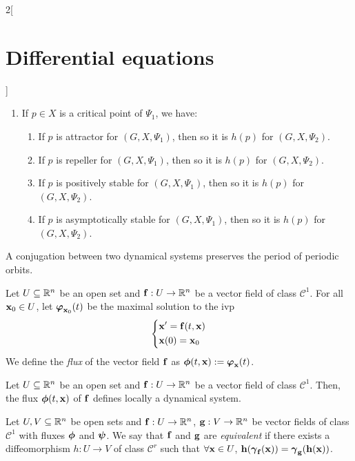 \documentclass[../../../main.tex]{subfiles}
\begin{document}
\begin{multicols}{2}[\section{Differential equations}]
\begin{prop}
\begin{enumerate}
\begin{enumerate}
            \end{enumerate}
      \item If $p\in X$ is a critical point of $\Psi_1$, we have:
            \begin{enumerate}
              \item If $p$ is attractor for $(G,X,\Psi_1)$, then so it is $h(p)$ for $(G,X,\Psi_2)$.
              \item If $p$ is repeller for $(G,X,\Psi_1)$, then so it is $h(p)$ for $(G,X,\Psi_2)$.
              \item If $p$ is positively stable for $(G,X,\Psi_1)$, then so it is $h(p)$ for $(G,X,\Psi_2)$.
              \item If $p$ is asymptotically stable for $(G,X,\Psi_1)$, then so it is $h(p)$ for $(G,X,\Psi_2)$.
            \end{enumerate}
    \end{enumerate}
  \end{prop}
  \begin{prop}
    A conjugation between two dynamical systems preserves the period of periodic orbits.
  \end{prop}
  \begin{definition}
    Let $U\subseteq \mathbb{R}^n$ be an open set and $\boldsymbol{\mathrm{f}}:U\rightarrow\mathbb{R}^n$ be a vector field of class $\mathcal{C}^1$. For all $\boldsymbol{\mathrm{x}}_0\in U$, let $\boldsymbol{\mathrm{\varphi}}_{\boldsymbol{\mathrm{x}}_0}(t)$ be the maximal solution to the ivp
    $$\left\{
      \begin{aligned}
         & \boldsymbol{\mathrm{x}}'      =\boldsymbol{\mathrm{f}}(t,\boldsymbol{\mathrm{x}}) \\
         & \boldsymbol{\mathrm{x}}(0)  =\boldsymbol{\mathrm{x}}_0
      \end{aligned}
      \right.$$
    We define the \textit{flux} of the vector field $\boldsymbol{\mathrm{f}}$ as $\boldsymbol{\mathrm{\phi}}(t,\boldsymbol{\mathrm{x}}):=\boldsymbol{\mathrm{\varphi}}_{\boldsymbol{\mathrm{x}}}(t)$.
  \end{definition}
  \begin{prop}
    Let $U\subseteq \mathbb{R}^n$ be an open set and $\boldsymbol{\mathrm{f}}:U\rightarrow\mathbb{R}^n$ be a vector field of class $\mathcal{C}^1$. Then, the flux $\boldsymbol{\mathrm{\phi}}(t,\boldsymbol{\mathrm{x}})$ of $\boldsymbol{\mathrm{f}}$ defines locally a dynamical system.
  \end{prop}
  \begin{definition}
    Let $U,V\subseteq \mathbb{R}^n$ be open sets and $\boldsymbol{\mathrm{f}}:U\rightarrow\mathbb{R}^n$, $\boldsymbol{\mathrm{g}}:V\rightarrow\mathbb{R}^n$ be vector fields of class $\mathcal{C}^1$ with fluxes $\boldsymbol{\mathrm{\phi}}$ and $\boldsymbol{\mathrm{\psi}}$. We say that $\boldsymbol{\mathrm{f}}$ and $\boldsymbol{\mathrm{g}}$ are \textit{equivalent} if there exists a diffeomorphism $h:U\rightarrow V$ of class $\mathcal{C}^r$ such that $\forall \boldsymbol{\mathrm{x}}\in U$, $\boldsymbol{\mathrm{h}}(\boldsymbol{\mathrm{\gamma}}_{\boldsymbol{\mathrm{f}}}(\boldsymbol{\mathrm{x}}))=\boldsymbol{\mathrm{\gamma}}_{\boldsymbol{\mathrm{g}}}(\boldsymbol{\mathrm{h}}(\boldsymbol{\mathrm{x}}))$.

\end{definition}
\end{multicols}
\end{document}
